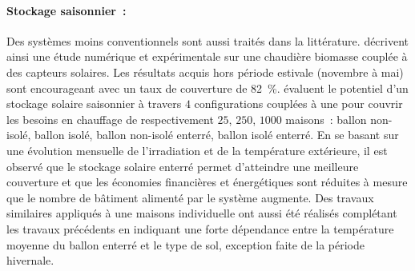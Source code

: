 \paragraph{Stockage saisonnier~:} %
\label{par:stockage_saisonnier}
Des systèmes moins conventionnels sont aussi traités dans la littérature.
\textcite{Hartl2012623} décrivent ainsi une étude numérique et expérimentale sur une
chaudière biomasse couplée à des capteurs solaires. Les résultats acquis hors période
estivale (novembre à mai) sont encourageant avec un taux de couverture de
\SI{82}{\percent}. \textcite{Ucar20082532} évaluent le potentiel d’un stockage
solaire saisonnier à travers $4$ configurations couplées à une  pour couvrir les
besoins en chauffage de respectivement $25$, $250$, $1000$ maisons~: ballon non-isolé,
ballon isolé, ballon non-isolé enterré, ballon isolé enterré. En se basant sur une
évolution mensuelle de l’irradiation et de la température extérieure, il est observé que
le stockage solaire enterré permet d’atteindre une meilleure couverture et que les
économies financières et énergétiques sont réduites à mesure que le nombre de bâtiment
alimenté par le système augmente. Des travaux similaires appliqués à une maisons
individuelle ont aussi été réalisés \parencite{Yumrutas2012983} complétant les travaux
précédents en indiquant une forte dépendance entre la température moyenne du ballon enterré
et le type de sol, exception faite de la période hivernale.


